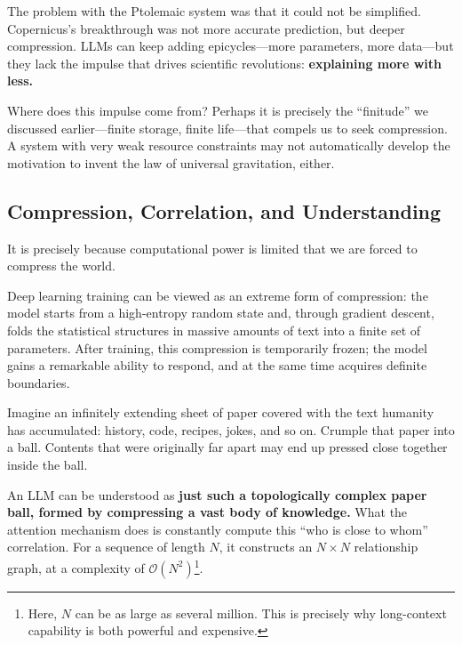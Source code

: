 The problem with the Ptolemaic system was that it could not be simplified. Copernicus's breakthrough was not more accurate prediction, but deeper compression.
LLMs can keep adding epicycles---more parameters, more data---but they lack the impulse that drives scientific revolutions: \textbf{explaining more with less.}

Where does this impulse come from? Perhaps it is precisely the ``finitude'' we discussed earlier---finite storage, finite life---that compels us to seek compression. A system with very weak resource constraints may not automatically develop the motivation to invent the law of universal gravitation, either.


\newpage
\subsection{Compression, Correlation, and Understanding}

It is precisely because computational power is limited that we are forced to compress the world.

Deep learning training can be viewed as an extreme form of compression: the model starts from a high-entropy random state and, through gradient descent, folds the statistical structures in massive amounts of text into a finite set of parameters. After training, this compression is temporarily frozen; the model gains a remarkable ability to respond, and at the same time acquires definite boundaries.

\vspace{1em}

Imagine an infinitely extending sheet of paper covered with the text humanity has accumulated: history, code, recipes, jokes, and so on. Crumple that paper into a ball. Contents that were originally far apart may end up pressed close together inside the ball.

\vspace{1em}

An LLM can be understood as \textbf{just such a topologically complex paper ball, formed by compressing a vast body of knowledge.}
What the attention mechanism does is constantly compute this ``who is close to whom'' correlation. For a sequence of length $N$, it constructs an $N \times N$ relationship graph, at a complexity of $\mathcal{O}(N^2)$\footnote{Here, $N$ can be as large as several million. This is precisely why long-context capability is both powerful and expensive.}.

\vspace{1em}

